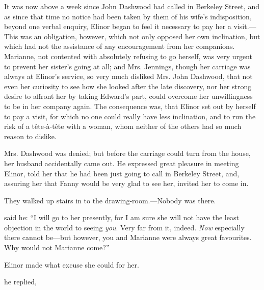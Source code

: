 It was now above a week since John Dashwood had called in Berkeley Street, and as since that time no notice had been taken by them of his wife's indisposition, beyond one verbal enquiry, Elinor began to feel it necessary to pay her a visit.---This was an obligation, however, which not only opposed her own inclination, but which had not the assistance of any encouragement from her companions. Marianne, not contented with absolutely refusing to go herself, was very urgent to prevent her sister's going at all; and Mrs. Jennings, though her carriage was always at Elinor's service, so very much disliked Mrs. John Dashwood, that not even her curiosity to see how she looked after the late discovery, nor her strong desire to affront her by taking Edward's part, could overcome her unwillingness to be in her company again. The consequence was, that Elinor set out by herself to pay a visit, for which no one could really have less inclination, and to run the risk of a tête-à-tête with a woman, whom neither of the others had so much reason to dislike.

Mrs. Dashwood was denied; but before the carriage could turn from the house, her husband accidentally came out. He expressed great pleasure in meeting Elinor, told her that he had been just going to call in Berkeley Street, and, assuring her that Fanny would be very glad to see her, invited her to come in.

They walked up stairs in to the drawing-room.---Nobody was there.

 said he: “I will go to her presently, for I am sure she will not have the least objection in the world to seeing {\em you}. Very far from it, indeed. {\em Now} especially there cannot be---but however, you and Marianne were always great favourites. Why would not Marianne come?”

Elinor made what excuse she could for her.

 he replied, 



